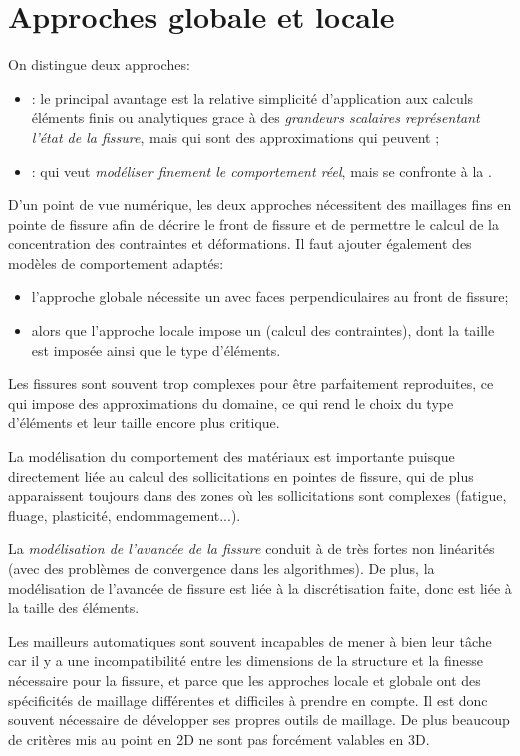 \section{Approches globale et locale}
On distingue deux approches:
\begin{itemize}
  \item {}: le principal avantage est la relative simplicité d'application
	aux calculs éléments finis ou analytiques grace à des \emph{grandeurs scalaires représentant l'état de
	la fissure}, mais qui sont des approximations qui peuvent ;
  \item {}: qui veut \emph{modéliser finement le comportement réel},
	mais se confronte à la .
\end{itemize}
\medskipvm
D'un point de vue numérique, les deux approches nécessitent des maillages fins en pointe de
fissure afin de décrire le front de fissure et de permettre le calcul de la concentration des contraintes
et déformations.
Il faut ajouter également des modèles de comportement adaptés:
\begin{itemize}
  \item l'approche globale nécessite un  avec faces perpendiculaires
	au front de fissure;
  \item alors que l'approche locale impose un  (calcul des contraintes), dont la
	taille est imposée ainsi que le type d'éléments.
\end{itemize}
\medskipvm
Les fissures sont souvent trop complexes pour être parfaitement reproduites, ce qui impose
des approximations du domaine, ce qui rend le choix du type d'éléments et leur taille encore
plus critique.

La modélisation du comportement des matériaux est importante puisque directement
liée au calcul des sollicitations en pointes de fissure, qui de plus apparaissent toujours dans
des zones où les sollicitations sont complexes (fatigue, fluage, plasticité, endommagement...).

La \emph{modélisation de l'avancée de la fissure} conduit à de très fortes non linéarités
(avec des problèmes de convergence dans les algorithmes).
De plus, la modélisation de l'avancée de fissure est liée à la discrétisation faite, donc est
liée à la taille des éléments.

Les mailleurs automatiques sont souvent incapables de mener à bien leur tâche car
il y a une incompatibilité entre les dimensions de la structure et la finesse nécessaire
pour la fissure, et parce que les approches locale et globale ont des spécificités de maillage
différentes et difficiles à prendre en compte.
Il est donc souvent nécessaire de développer ses propres outils de maillage.
De plus beaucoup de critères mis au point en 2D ne sont pas forcément valables
en 3D.

